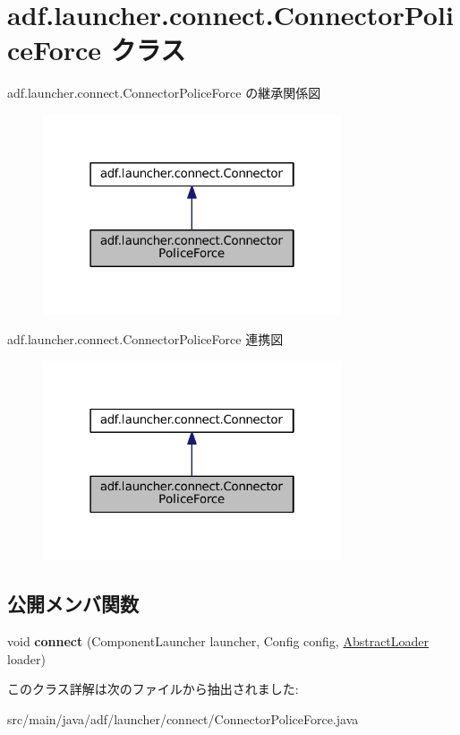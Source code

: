 \hypertarget{classadf_1_1launcher_1_1connect_1_1ConnectorPoliceForce}{}\section{adf.\+launcher.\+connect.\+Connector\+Police\+Force クラス}
\label{classadf_1_1launcher_1_1connect_1_1ConnectorPoliceForce}


adf.\+launcher.\+connect.\+Connector\+Police\+Force の継承関係図
\nopagebreak
\begin{figure}[H]
\begin{center}
\leavevmode
\includegraphics[width=250pt]{classadf_1_1launcher_1_1connect_1_1ConnectorPoliceForce__inherit__graph}
\end{center}
\end{figure}


adf.\+launcher.\+connect.\+Connector\+Police\+Force 連携図
\nopagebreak
\begin{figure}[H]
\begin{center}
\leavevmode
\includegraphics[width=250pt]{classadf_1_1launcher_1_1connect_1_1ConnectorPoliceForce__coll__graph}
\end{center}
\end{figure}
\subsection*{公開メンバ関数}
\begin{DoxyCompactItemize}
\item 
\hypertarget{classadf_1_1launcher_1_1connect_1_1ConnectorPoliceForce_a21bcf528d065965b241cec3d77c0bed8}{}\label{classadf_1_1launcher_1_1connect_1_1ConnectorPoliceForce_a21bcf528d065965b241cec3d77c0bed8} 
void {\bfseries connect} (Component\+Launcher launcher, Config config, \hyperlink{classadf_1_1component_1_1AbstractLoader}{Abstract\+Loader} loader)
\end{DoxyCompactItemize}


このクラス詳解は次のファイルから抽出されました\+:\begin{DoxyCompactItemize}
\item 
src/main/java/adf/launcher/connect/Connector\+Police\+Force.\+java\end{DoxyCompactItemize}
